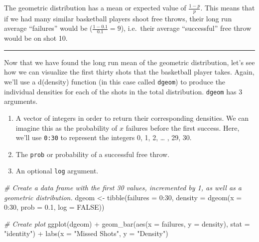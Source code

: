 \documentclass[
]{book}
\newenvironment{Shaded}{\begin{snugshade}}{\end{snugshade}}
\newcommand{\AttributeTok}[1]{\textcolor[rgb]{0.77,0.63,0.00}{#1}}
\newcommand{\CommentTok}[1]{\textcolor[rgb]{0.56,0.35,0.01}{\textit{#1}}}
\newcommand{\ConstantTok}[1]{\textcolor[rgb]{0.00,0.00,0.00}{#1}}
\newcommand{\DecValTok}[1]{\textcolor[rgb]{0.00,0.00,0.81}{#1}}
\newcommand{\FloatTok}[1]{\textcolor[rgb]{0.00,0.00,0.81}{#1}}
\newcommand{\FunctionTok}[1]{\textcolor[rgb]{0.00,0.00,0.00}{#1}}
\newcommand{\NormalTok}[1]{#1}
\newcommand{\OtherTok}[1]{\textcolor[rgb]{0.56,0.35,0.01}{#1}}
\newcommand{\SpecialCharTok}[1]{\textcolor[rgb]{0.00,0.00,0.00}{#1}}
\newcommand{\StringTok}[1]{\textcolor[rgb]{0.31,0.60,0.02}{#1}}
\begin{document}
The geometric distribution has a mean or expected value of \(\frac{1-p}{p}\). This means that if we had many similar basketball players shoot free throws, their long run average ``failures'' would be (\(\frac{1-0.1}{0.1}=9\)), i.e.~their average ``successful'' free throw would be on shot 10.

\begin{center}\rule{0.5\linewidth}{0.5pt}\end{center}

Now that we have found the long run mean of the geometric distribution, let's see how we can visualize the first thirty shots that the basketball player takes. Again, we'll use a d(density) function (in this case called \texttt{dgeom}) to produce the individual densities for each of the shots in the total distribution. \texttt{dgeom} has 3 arguments.

\begin{enumerate}
\def\labelenumi{\arabic{enumi}.}
\item
  A vector of integers in order to return their corresponding densities. We can imagine this as the probability of \(x\) failures before the first success. Here, we'll use \texttt{0:30} to represent the integers 0, 1, 2, \ldots{} , 29, 30.
\item
  The \texttt{prob} or probability of a successful free throw.
\item
  An optional \texttt{log} argument.
\end{enumerate}

\begin{Shaded}
\begin{Highlighting}[]
\CommentTok{\# Create a data frame with the first 30 values, incremented by 1, as well as a geometric distribution.}
\NormalTok{dgeom }\OtherTok{\textless{}{-}} \FunctionTok{tibble}\NormalTok{(}\AttributeTok{failures =} \DecValTok{0}\SpecialCharTok{:}\DecValTok{30}\NormalTok{,}
                \AttributeTok{density =} \FunctionTok{dgeom}\NormalTok{(}\AttributeTok{x =} \DecValTok{0}\SpecialCharTok{:}\DecValTok{30}\NormalTok{, }\AttributeTok{prob =} \FloatTok{0.1}\NormalTok{, }\AttributeTok{log =} \ConstantTok{FALSE}\NormalTok{))}

\CommentTok{\# Create plot}
\FunctionTok{ggplot}\NormalTok{(dgeom) }\SpecialCharTok{+}
  \FunctionTok{geom\_bar}\NormalTok{(}\FunctionTok{aes}\NormalTok{(}\AttributeTok{x =}\NormalTok{ failures, }\AttributeTok{y =}\NormalTok{ density), }\AttributeTok{stat =} \StringTok{"identity"}\NormalTok{) }\SpecialCharTok{+}
  \FunctionTok{labs}\NormalTok{(}\AttributeTok{x =} \StringTok{"Missed Shots"}\NormalTok{, }\AttributeTok{y =} \StringTok{"Density"}\NormalTok{)}
\end{Highlighting}
\end{Shaded}
\end{document}
